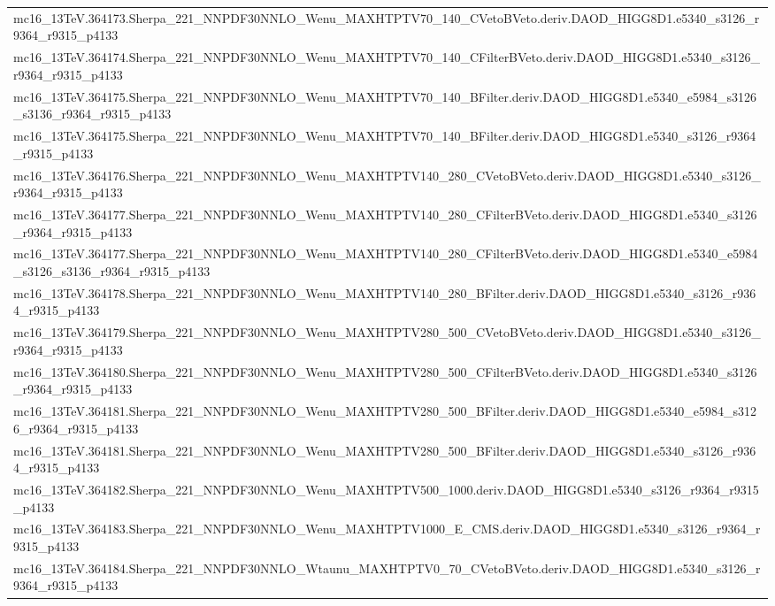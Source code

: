 \begin{adjustwidth}{-3em}{-3em}
\begin{longtable}{l}
mc16\_13TeV.364173.Sherpa\_221\_NNPDF30NNLO\_Wenu\_MAXHTPTV70\_140\_CVetoBVeto.deriv.DAOD\_HIGG8D1.e5340\_s3126\_r9364\_r9315\_p4133 \\
mc16\_13TeV.364174.Sherpa\_221\_NNPDF30NNLO\_Wenu\_MAXHTPTV70\_140\_CFilterBVeto.deriv.DAOD\_HIGG8D1.e5340\_s3126\_r9364\_r9315\_p4133 \\
mc16\_13TeV.364175.Sherpa\_221\_NNPDF30NNLO\_Wenu\_MAXHTPTV70\_140\_BFilter.deriv.DAOD\_HIGG8D1.e5340\_e5984\_s3126\_s3136\_r9364\_r9315\_p4133 \\
mc16\_13TeV.364175.Sherpa\_221\_NNPDF30NNLO\_Wenu\_MAXHTPTV70\_140\_BFilter.deriv.DAOD\_HIGG8D1.e5340\_s3126\_r9364\_r9315\_p4133 \\
mc16\_13TeV.364176.Sherpa\_221\_NNPDF30NNLO\_Wenu\_MAXHTPTV140\_280\_CVetoBVeto.deriv.DAOD\_HIGG8D1.e5340\_s3126\_r9364\_r9315\_p4133 \\
mc16\_13TeV.364177.Sherpa\_221\_NNPDF30NNLO\_Wenu\_MAXHTPTV140\_280\_CFilterBVeto.deriv.DAOD\_HIGG8D1.e5340\_s3126\_r9364\_r9315\_p4133 \\
mc16\_13TeV.364177.Sherpa\_221\_NNPDF30NNLO\_Wenu\_MAXHTPTV140\_280\_CFilterBVeto.deriv.DAOD\_HIGG8D1.e5340\_e5984\_s3126\_s3136\_r9364\_r9315\_p4133 \\
mc16\_13TeV.364178.Sherpa\_221\_NNPDF30NNLO\_Wenu\_MAXHTPTV140\_280\_BFilter.deriv.DAOD\_HIGG8D1.e5340\_s3126\_r9364\_r9315\_p4133 \\
mc16\_13TeV.364179.Sherpa\_221\_NNPDF30NNLO\_Wenu\_MAXHTPTV280\_500\_CVetoBVeto.deriv.DAOD\_HIGG8D1.e5340\_s3126\_r9364\_r9315\_p4133 \\
mc16\_13TeV.364180.Sherpa\_221\_NNPDF30NNLO\_Wenu\_MAXHTPTV280\_500\_CFilterBVeto.deriv.DAOD\_HIGG8D1.e5340\_s3126\_r9364\_r9315\_p4133 \\
mc16\_13TeV.364181.Sherpa\_221\_NNPDF30NNLO\_Wenu\_MAXHTPTV280\_500\_BFilter.deriv.DAOD\_HIGG8D1.e5340\_e5984\_s3126\_r9364\_r9315\_p4133 \\
mc16\_13TeV.364181.Sherpa\_221\_NNPDF30NNLO\_Wenu\_MAXHTPTV280\_500\_BFilter.deriv.DAOD\_HIGG8D1.e5340\_s3126\_r9364\_r9315\_p4133 \\
mc16\_13TeV.364182.Sherpa\_221\_NNPDF30NNLO\_Wenu\_MAXHTPTV500\_1000.deriv.DAOD\_HIGG8D1.e5340\_s3126\_r9364\_r9315\_p4133 \\
mc16\_13TeV.364183.Sherpa\_221\_NNPDF30NNLO\_Wenu\_MAXHTPTV1000\_E\_CMS.deriv.DAOD\_HIGG8D1.e5340\_s3126\_r9364\_r9315\_p4133 \\
mc16\_13TeV.364184.Sherpa\_221\_NNPDF30NNLO\_Wtaunu\_MAXHTPTV0\_70\_CVetoBVeto.deriv.DAOD\_HIGG8D1.e5340\_s3126\_r9364\_r9315\_p4133 \\

\end{longtable}
\end{adjustwidth}
